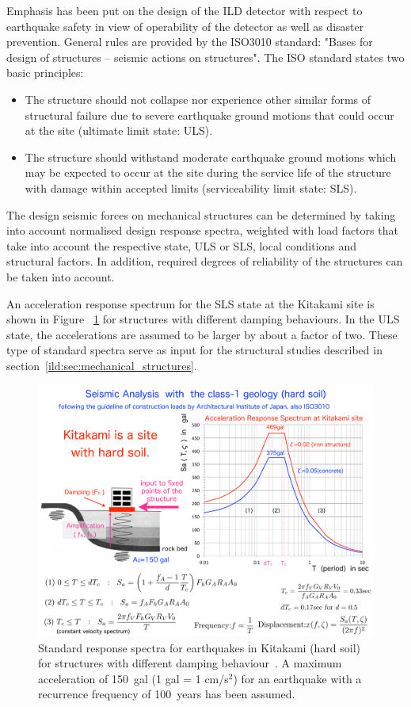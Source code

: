 Emphasis has been put on the design of the ILD detector with respect to earthquake safety in view of operability of the detector as well as disaster prevention. General rules are provided by the ISO3010 standard: "Bases for design of structures -- seismic actions on structures". The ISO standard states two basic principles:
\begin{itemize}
\item The structure should not collapse nor experience other similar forms of structural failure due to severe earthquake ground motions that could occur at the site (ultimate limit state: ULS).
\item The structure should withstand moderate earthquake ground motions which may be expected to occur at the site during the service life of the structure with damage within accepted limits (serviceability limit state: SLS).
\end{itemize}

The design seismic forces on mechanical structures can be determined by taking into account normalised design response spectra, weighted with load factors that take into account the respective state, ULS or SLS, local conditions and structural factors. In addition, required degrees of reliability of the structures can be taken into account.

An acceleration response spectrum for the SLS state at the Kitakami site is shown in Figure~ \ref{ild:fig:integration:earthquake_spectra} for structures with different damping behaviours. In the ULS state, the accelerations are assumed to be larger by about a factor of two. These type of standard spectra serve as input for the structural studies described in section~\ref{ild:sec:mechanical_structures}.
\begin{figure}[t!]
\includegraphics[width=0.8\hsize]{Integration/fig/earthquake_spectra.pdf}
\caption{\label{ild:fig:integration:earthquake_spectra}Standard response spectra for earthquakes in Kitakami (hard soil) for structures with different damping behaviour~\cite{ild:bib:earthquake}. A maximum acceleration of 150~gal (1 gal = 1 cm/s$^2$) for an earthquake with a recurrence frequency of 100~years has been assumed.}
\end{figure}

